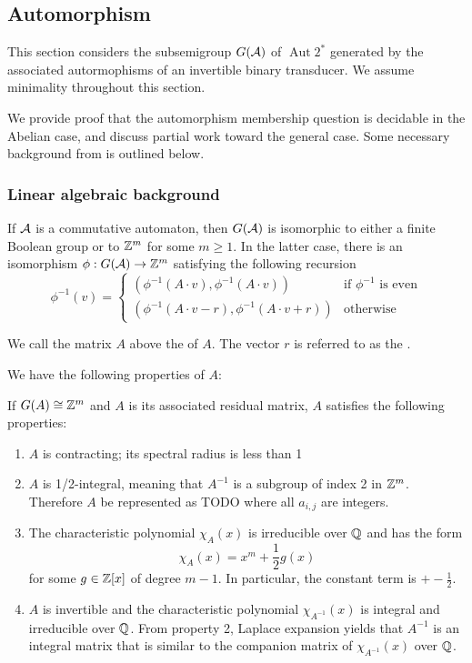 \documentclass[11pt]{article}
\begin{document}
\subsection{Automorphism }

This section considers the subsemigroup $G(\mathcal{A})$ of
$\operatorname{Aut}2^*$ generated by the associated autormophisms of
an invertible binary transducer. We assume minimality throughout this
section.

We provide proof that the automorphism membership question is
decidable in the Abelian case, and discuss partial work toward the
general case. Some necessary background from
\cite{NekrashevychSidki04:automorphisms} is outlined below.

\subsubsection{Linear algebraic background}

\begin{theorem}
If $\mathcal{A}$ is a commutative automaton, then $G(\mathcal{A})$ is
isomorphic to either a finite Boolean group or to $\mathbb{Z}^m$ for some
$m \geq 1$. In the latter case, there is an isomorphism
$\phi : G(\mathcal{A}) \rightarrow \mathbb{Z}^m$ satisfying the following recursion
\[
  \phi^{-1}(v) =
  \begin{cases}
    (\phi^{-1}(A\cdot v), \phi^{-1}(A \cdot v)) & \text{if $\phi^{-1}$ is even}\\
    (\phi^{-1}(A\cdot v - r), \phi^{-1}(A \cdot v + r)) &
    \text{otherwise}
  \end{cases}
\]
\end{theorem}

We call the matrix $A$ above the  of $A$. The
vector $r$ is referred to as the .

We have the following properties of $A$:

\begin{theorem}
If $G(A) \cong \mathbb{Z}^m$ and $A$ is its associated
residual matrix, $A$ satisfies the following properties:
\begin{enumerate}
\item $A$ is contracting; its spectral radius is less than 1
\item $A$ is 1/2-integral, meaning that $A^{-1}$ is a subgroup of
  index 2 in $\mathbb{Z}^m$. Therefore $A$ be represented as TODO where all
  $a_{i,j}$ are integers.
\item The characteristic polynomial $\chi_A(x)$ is irreducible over
  $\mathbb{Q}$ and has the form
  \[ \chi_A(x) = x^m + \frac{1}{2}g(x) \] for some $g \in \mathbb{Z}[x]$ of
  degree $m-1$. In particular, the constant term is $+-\frac{1}{2}$.
\item $A$ is invertible and the characteristic polynomial
  $\chi_{A^{-1}}(x)$ is integral and irreducible over $\mathbb{Q}$. From
  property 2, Laplace expansion yields that $A^{-1}$ is an integral
  matrix that is similar to the companion matrix of $\chi_{A^{-1}}(x)$
  over $\mathbb{Q}$.
\end{enumerate}
\end{theorem}
\end{document}
